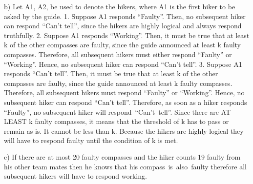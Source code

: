 \documentclass[a4paper]{exam}
\begin{document}
\begin{questions}
\begin{solution}
    b) Let A1, A2, be used to denote the hikers, where A1 is the first hiker to be asked by the guide.
    1. Suppose A1 responds “Faulty”. Then, no subsequent hiker can respond “Can’t tell”, since the hikers are highly logical and always respond truthfully. 
    2. Suppose A1 responds “Working”. Then, it must be true that at least k of the other compasses are faulty, since the guide announced at least k faulty compasses. Therefore, all subsequent hikers must either respond “Faulty” or “Working”. Hence, no subsequent hiker can respond “Can’t tell”. 
    3. Suppose A1 responds “Can’t tell”. Then, it must be true that at least k of the other compasses are faulty, since the guide announced at least k faulty compasses. Therefore, all subsequent hikers must respond “Faulty” or “Working”. Hence, no subsequent hiker can respond “Can’t tell”. Therefore, as soon as a hiker responds “Faulty”, no subsequent hiker will respond “Can’t tell”.
    Since there are AT LEAST k faulty compasses, it means that the threshold of k has to pass or remain as is. It cannot be less than k. Because the hikers are highly logical they will have to respond faulty until the condition of k is met.
    
    c) If there are at most 20 faulty compasses and the hiker counts 19 faulty from his other team mates then he knows that his compass is also faulty therefore all subsequent hikers will have to respond working.
  \end{solution}
\end{questions}
\end{document}
